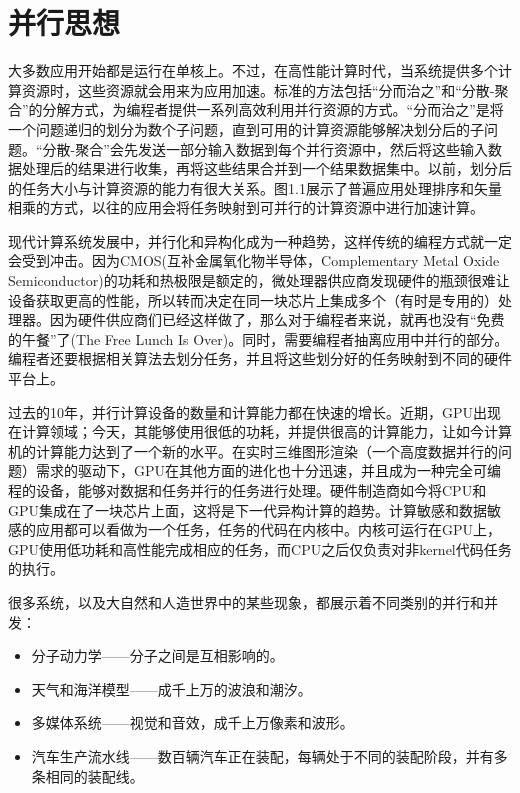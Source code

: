 \section{并行思想}

大多数应用开始都是运行在单核上。不过，在高性能计算时代，当系统提供多个计算资源时，这些资源就会用来为应用加速。标准的方法包括“分而治之”和“分散-聚合”的分解方式，为编程者提供一系列高效利用并行资源的方式。“分而治之”是将一个问题递归的划分为数个子问题，直到可用的计算资源能够解决划分后的子问题。“分散-聚合”会先发送一部分输入数据到每个并行资源中，然后将这些输入数据处理后的结果进行收集，再将这些结果合并到一个结果数据集中。以前，划分后的任务大小与计算资源的能力有很大关系。图1.1展示了普遍应用处理排序和矢量相乘的方式，以往的应用会将任务映射到可并行的计算资源中进行加速计算。


现代计算系统发展中，并行化和异构化成为一种趋势，这样传统的编程方式就一定会受到冲击。因为CMOS(互补金属氧化物半导体，Complementary Metal Oxide Semiconductor)的功耗和热极限是额定的，微处理器供应商发现硬件的瓶颈很难让设备获取更高的性能，所以转而决定在同一块芯片上集成多个（有时是专用的）处理器。因为硬件供应商们已经这样做了，那么对于编程者来说，就再也没有“免费的午餐”了(The Free Lunch Is Over)。同时，需要编程者抽离应用中并行的部分。编程者还要根据相关算法去划分任务，并且将这些划分好的任务映射到不同的硬件平台上。

过去的10年，并行计算设备的数量和计算能力都在快速的增长。近期，GPU出现在计算领域；今天，其能够使用很低的功耗，并提供很高的计算能力，让如今计算机的计算能力达到了一个新的水平。在实时三维图形渲染（一个高度数据并行的问题）需求的驱动下，GPU在其他方面的进化也十分迅速，并且成为一种完全可编程的设备，能够对数据和任务并行的任务进行处理。硬件制造商如今将CPU和GPU集成在了一块芯片上面，这将是下一代异构计算的趋势。计算敏感和数据敏感的应用都可以看做为一个任务，任务的代码在内核中。内核可运行在GPU上，GPU使用低功耗和高性能完成相应的任务，而CPU之后仅负责对非kernel代码任务的执行。

很多系统，以及大自然和人造世界中的某些现象，都展示着不同类别的并行和并发：

\begin{itemize}
\item 分子动力学——分子之间是互相影响的。
\item 天气和海洋模型——成千上万的波浪和潮汐。
\item 多媒体系统——视觉和音效，成千上万像素和波形。
\item 汽车生产流水线——数百辆汽车正在装配，每辆处于不同的装配阶段，并有多条相同的装配线。
\end{itemize}

